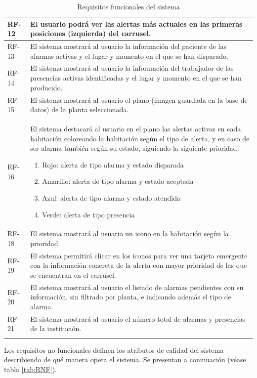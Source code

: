 \begin{longtable}{|p{1cm}|p{14cm}|}
	\hline
	RF-12	&	El usuario podrá ver las alertas más actuales en las primeras posiciones (izquierda) del carrusel. \\
	\hline
	RF-13	&	El sistema mostrará al usuario la información del paciente de las alarmas activas y el lugar y momento en el que se han disparado. \\
	\hline
	RF-14	&	El sistema mostrará al usuario la información del trabajador de las presencias activas identificadas y el lugar y momento en el que se han producido. \\
	\hline
	RF-15	&	El sistema mostrará al usuario el plano (imagen guardada en la base de datos) de la planta seleccionada.  \\
	\hline
	RF-16	&	El sistema destacará al usuario en el plano las alertas activas en cada habitación coloreando la habitación según el tipo de alerta, y en caso de ser alarma también según su estado, siguiendo la siguiente prioridad:
	\begin{enumerate}
		\item Rojo: alerta de tipo alarma y estado disparada
		\item Amarillo: alerta de tipo alarma y estado aceptada
		\item Azul: alerta de tipo alarma y estado atendida
		\item Verde: alerta de tipo presencia
	\end{enumerate}\\
	\hline
	RF-18	&	El sistema mostrará al usuario un icono en la habitación según la prioridad. \\
	\hline
	RF-19	&	El sistema permitirá clicar en los iconos para ver una tarjeta emergente con la información concreta de la alerta con mayor prioridad de las que se encuentran en el carrusel. \\
	\hline
	RF-20	&	El sistema mostrará al usuario el listado de alarmas pendientes con su información, sin filtrado por planta, e indicando además el tipo de alarma. \\
	\hline
	RF-21	&	El sistema mostrará al usuario el número total de alarmas y presencias de la institución. \\
	\hline
\caption{Requisitos funcionales del sistema}
\label{tab:RF}
\end{longtable}

Los requisitos no funcionales definen los atributos de calidad del sistema describiendo de qué manera opera el sistema. Se presentan a coninuación (véase tabla \ref{tab:RNF}).

